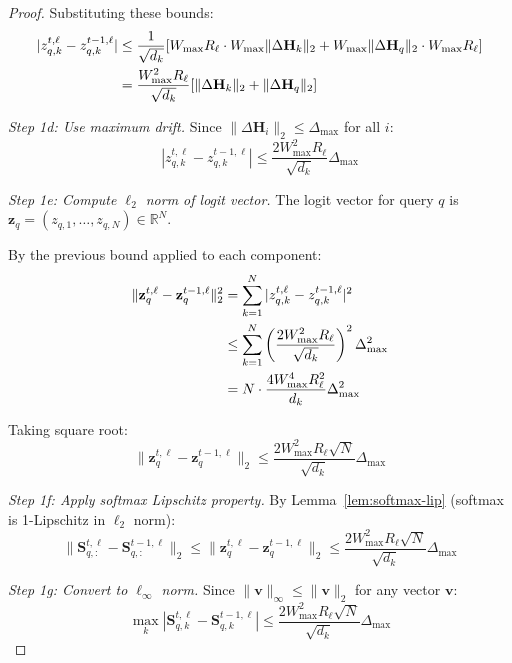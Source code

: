 \documentclass{article} %
\theoremstyle{definition}
\theoremstyle{remark}
\begin{document}
\begin{proof}
Substituting these bounds:
\begin{align}
|z^{t,\ell}_{q,k} - z^{t-1,\ell}_{q,k}| &\leq \frac{1}{\sqrt{d_k}}[W_{\max} R_\ell \cdot W_{\max} \|\Delta\mathbf{H}_k\|_2 + W_{\max} \|\Delta\mathbf{H}_q\|_2 \cdot W_{\max} R_\ell]\notag\\
&= \frac{W_{\max}^2 R_\ell}{\sqrt{d_k}}[\|\Delta\mathbf{H}_k\|_2 + \|\Delta\mathbf{H}_q\|_2]
\end{align}

\textit{Step 1d: Use maximum drift.}
Since $\|\Delta\mathbf{H}_i\|_2 \leq \Delta_{\max}$ for all $i$:
\begin{equation}
|z^{t,\ell}_{q,k} - z^{t-1,\ell}_{q,k}| \leq \frac{2W_{\max}^2 R_\ell}{\sqrt{d_k}} \Delta_{\max}
\end{equation}

\textit{Step 1e: Compute $\ell_2$ norm of logit vector.}
The logit vector for query $q$ is $\mathbf{z}_q = (z_{q,1}, \ldots, z_{q,N}) \in \mathbb{R}^N$.

By the previous bound applied to each component:
\begin{align}
\|\mathbf{z}^{t,\ell}_q - \mathbf{z}^{t-1,\ell}_q\|_2^2 &= \sum_{k=1}^N |z^{t,\ell}_{q,k} - z^{t-1,\ell}_{q,k}|^2\notag\\
&\leq \sum_{k=1}^N \left(\frac{2W_{\max}^2 R_\ell}{\sqrt{d_k}}\right)^2 \Delta_{\max}^2\notag\\
&= N \cdot \frac{4W_{\max}^4 R_\ell^2}{d_k} \Delta_{\max}^2
\end{align}

Taking square root:
\begin{equation}
\|\mathbf{z}^{t,\ell}_q - \mathbf{z}^{t-1,\ell}_q\|_2 \leq \frac{2W_{\max}^2 R_\ell \sqrt{N}}{\sqrt{d_k}} \Delta_{\max}
\end{equation}

\textit{Step 1f: Apply softmax Lipschitz property.}
By Lemma~\ref{lem:softmax-lip} (softmax is 1-Lipschitz in $\ell_2$ norm):
\begin{equation}
\|\mathbf{S}^{t,\ell}_{q,:} - \mathbf{S}^{t-1,\ell}_{q,:}\|_2 \leq \|\mathbf{z}^{t,\ell}_q - \mathbf{z}^{t-1,\ell}_q\|_2 \leq \frac{2W_{\max}^2 R_\ell \sqrt{N}}{\sqrt{d_k}} \Delta_{\max}
\end{equation}

\textit{Step 1g: Convert to $\ell_\infty$ norm.}
Since $\|\mathbf{v}\|_\infty \leq \|\mathbf{v}\|_2$ for any vector $\mathbf{v}$:
\begin{equation}\label{eq:attention-weight-bound}
\max_k |\mathbf{S}^{t,\ell}_{q,k} - \mathbf{S}^{t-1,\ell}_{q,k}| \leq \frac{2W_{\max}^2 R_\ell \sqrt{N}}{\sqrt{d_k}} \Delta_{\max}
\end{equation}


\end{proof}
\end{document}
